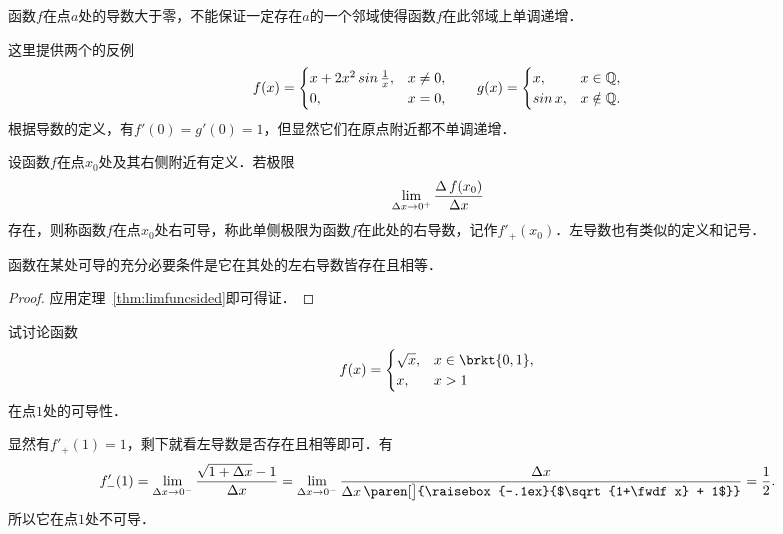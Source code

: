 \begin{example*}
  函数\(f\)在点\(a\)处的导数大于零，不能保证一定存在\(a\)的一个邻域使得函数\(f\)在此邻域上单调递增．

  \begin{remark}
    这里提供两个的反例
    \begin{equation*}
      f(x) =
      \begin{cases}
        x + 2 x^2 \operatorname{\smash{sin}}\frac1x, & x \ne 0, \\
        0, & x = 0,
      \end{cases}
      \qquad
      g(x) =
      \begin{cases}
        x, & x \in \mathbb{Q}, \\
        \operatorname{\smash{sin}} x, & x \notin \mathbb{Q}.
      \end{cases}
    \end{equation*}
    根据导数的定义，有\(f'(0) = g'(0) = 1\)，但显然它们在原点附近都不单调递增．
  \end{remark}
\end{example*}

\begin{definition*}
  设函数\(f\)在点\(x_0\)处及其右侧附近有定义．若极限
  \begin{equation*}
    \lim_{\mathop{}\!\Delta x \to 0^+} \frac{\mathop{}\!\Delta\,f(x_0)}{\mathop{}\!\Delta x}
  \end{equation*}
  存在，则称函数\(f\)在点\(x_0\)处右可导，称此单侧极限为函数\(f\)在此处的右导数，记作\(f'_+(x_0)\)．左导数也有类似的定义和记号．
\end{definition*}

\begin{theorem}
  \label{thm:derivsided}
  函数在某处可导的充分必要条件是它在其处的左右导数皆存在且相等．

  \begin{proof}
    应用定理~\ref{thm:limfuncsided}即可得证．
  \end{proof}
\end{theorem}

\begin{example*}
  试讨论函数
  \begin{equation*}
    f(x) =
    \begin{cases}
      \sqrt x, & x \in \brkt{0,1}, \\
      x, & x > 1
    \end{cases}
  \end{equation*}
  在点\(1\)处的可导性．

  \begin{remark}
    显然有\(f'_+(1) = 1\)，剩下就看左导数是否存在且相等即可．有
    \begin{equation*}
      f'_-(1)
      = \lim_{\fwdf x \to 0^-} \frac{\sqrt{1+\fwdf x} - 1}{\fwdf x}
      = \lim_{\fwdf x \to 0^-} \frac{\fwdf x}{\raisebox{-.1ex}{$\fwdf x$}\,\paren[\big]{\raisebox{-.1ex}{$\sqrt{1+\fwdf x} + 1$}}}
      = \frac12.
    \end{equation*}
    所以它在点\(1\)处不可导．
  \end{remark}
\end{example*}

